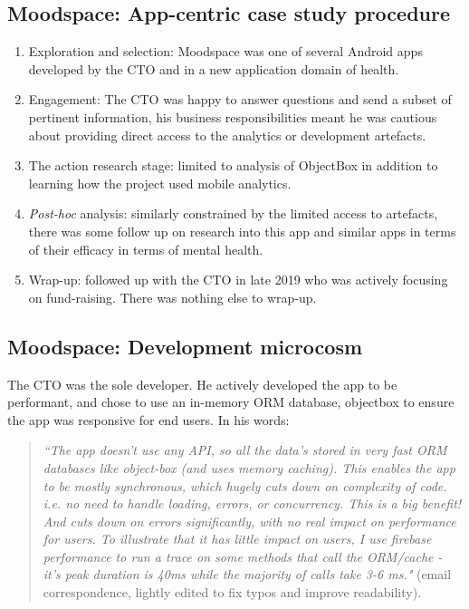\subsection{Moodspace: App-centric case study procedure}
{\small
\begin{enumerate}
    \itemsep0em
    \item Exploration and selection: Moodspace was one of several Android apps developed by the CTO and in a new application domain of health. 
    \item Engagement: The CTO was happy to answer questions and send a subset of pertinent information, his business responsibilities meant he was cautious about providing direct access to the analytics or development artefacts. 
    \item The action research stage: limited to analysis of ObjectBox in addition to learning how the project used mobile analytics.
    \item \textit{Post-hoc} analysis: similarly constrained by the limited access to artefacts, there was some follow up on research into this app and similar apps in terms of their efficacy in terms of mental health.
    \item Wrap-up: followed up with the CTO in late 2019 who was actively focusing on fund-raising. There was nothing else to wrap-up.
\end{enumerate}
}


\subsection{Moodspace: Development microcosm}
The CTO was the sole developer. He actively developed the app to be performant, and chose to use an in-memory ORM database, objectbox to ensure the app was responsive for end users. In his words: 

\begin{quote}
\emph{``The app doesn't use any API, so all the data's stored in very fast ORM databases like object-box (and uses memory caching). This enables the app to be mostly synchronous, which hugely cuts down on complexity of code. i.e. no need to handle loading, errors, or concurrency. This is a big benefit! And cuts down on errors significantly, with no real impact on performance for users. To illustrate that it has little impact on users, I use firebase performance to run a trace on some methods that call the ORM/cache - it's peak duration is 40ms while the majority of calls take 3-6 ms."} (email correspondence, lightly edited to fix typos and improve readability).    
\end{quote}


